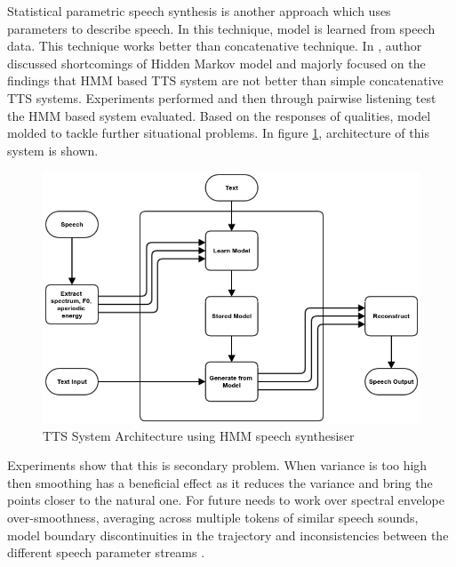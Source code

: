 Statistical parametric speech synthesis is another approach which uses parameters to describe
speech. In this technique, model is learned from speech data. This technique works better than
concatenative technique. In \cite{merritt2013investigating}, author discussed shortcomings of Hidden Markov model and majorly focused on the findings that HMM based TTS system are not better than simple concatenative TTS systems. Experiments performed and then through pairwise listening test the HMM based system evaluated. Based on the responses of qualities, model molded to tackle further situational problems. In figure \ref{fig:Merritt_tts}, architecture of this system is shown.
\begin{center}
	\begin{figure}[hbtp]
		\centering
		\includegraphics[width=\linewidth]{images/Merritt_tts.png}
		\caption{TTS System Architecture using HMM speech synthesiser}
		\label{fig:Merritt_tts}
	\end{figure}
\end{center}

Experiments show that this is secondary problem. When variance is too high then smoothing has a beneficial effect as it
reduces the variance and bring the points closer to the natural one. For future needs to work over spectral envelope over-smoothness, averaging across multiple tokens of similar speech sounds, model boundary discontinuities in the trajectory and
inconsistencies between the different speech parameter streams \cite{merritt2013investigating}.

